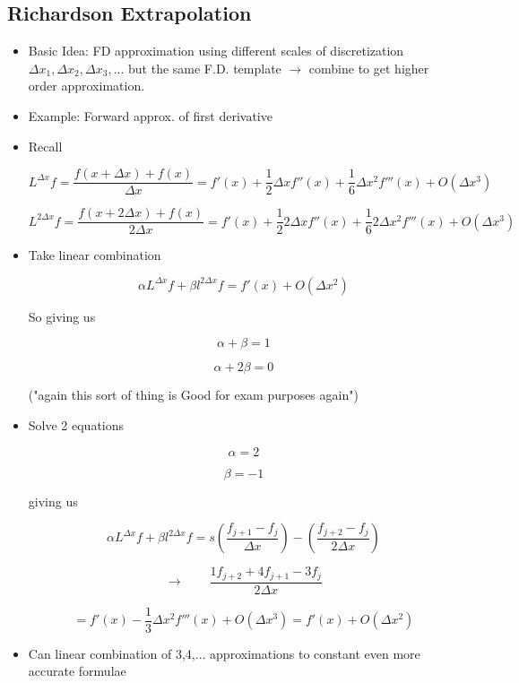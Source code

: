 \subsection{Richardson Extrapolation}
\begin{itemize}
    \item Basic Idea: FD approximation using different scales of discretization $\Delta x_1,\Delta x_2,\Delta x_3,...$ but the same F.D. template $\rightarrow$ combine to get higher order approximation.
    \item Example: Forward approx. of first derivative
    \item Recall

    \[ L^{\Delta x} f = \frac{f(x+\Delta x)+f(x)}{\Delta x} = f'(x) + \frac{1}{2} \Delta x f''(x)+ \frac{1}{6} \Delta x^2 f'''(x) + O(\Delta x^3)\]

    \[ L^{2\Delta x} f = \frac{f(x+2\Delta x)+f(x)}{2\Delta x} = f'(x) + \frac{1}{2} 2\Delta x f''(x)+ \frac{1}{6} 2\Delta x^2 f'''(x) + O(\Delta x^3)\]

    \item Take linear combination

    \[ \alpha L^{\Delta x} f+ \beta l^{2\Delta x} f = f'(x) + O(\Delta x^2)\]

    So giving us

    \[ \alpha + \beta = 1 \]

    \[ \alpha + 2\beta = 0 \]

    ("again this sort of thing is Good for exam purposes again")

    \item Solve 2 equations 

    \[ \alpha = 2\]

    \[ \beta = -1 \]

    giving us

    \[ \alpha L^{\Delta x} f+ \beta l^{2\Delta x} f = s\left( \frac{f_{j+1}-f_j}{\Delta x}\right) - \left(\frac{f_{j+2}-f_j}{2 \Delta x}\right) \]

    

    \[ \rightarrow \qquad \frac{1f_{j+2}+4f_{j+1}-3f_j}{2\Delta x}\]

    \[ = f'(x) - \frac{1}{3} \Delta x^2 f'''(x) + O (\Delta x^3) = f'(x) + O(\Delta x^2)  \]

    \item Can linear combination of 3,4,... approximations to constant even more accurate formulae
    
    
\end{itemize}
